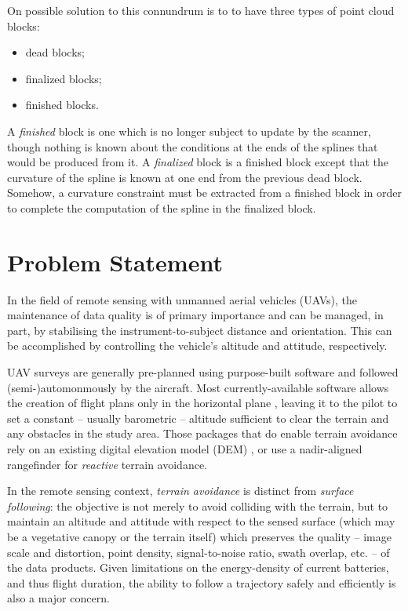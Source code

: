 \documentclass[doc]{apa6}
\begin{document}
On possible solution to this connundrum is to to have three types of point cloud blocks: 

\begin{itemize}
\item dead blocks;
\item finalized blocks;
\item finished blocks.
\end{itemize}

A \emph{finished} block is one which is no longer subject to update by the scanner, though nothing is known about the conditions at the ends of the splines that would be produced from it. A \emph{finalized} block is a finished block except that the curvature of the spline is known at one end from the previous dead block. Somehow, a curvature constraint must be extracted from a finished block in order to complete the computation of the spline in the finalized block.








\section{Problem Statement}

In the field of remote sensing with unmanned aerial vehicles (UAVs), the maintenance of data quality is of primary importance and can be managed, in part, by stabilising the instrument-to-subject distance and orientation. This can be accomplished by controlling the vehicle's altitude and attitude, respectively.

UAV surveys are generally pre-planned using purpose-built software and followed (semi-)automonmously by the aircraft. Most currently-available software allows the creation of flight plans only in the horizontal plane \parencite[e.g.,][]{ArduPilot2018,DJI2018a,Microdrones2018,Group2018,UAVToolbox2018}, leaving it to the pilot to set a constant -- usually barometric -- altitude sufficient to clear the terrain and any obstacles in the study area. Those packages that do enable terrain avoidance rely on an  existing digital elevation model (DEM) \parencite[e.g.,][]{PrecisionHawk2018,UgCS2018,MapsMadeEasy2018}, or use a nadir-aligned rangefinder for \emph{reactive} terrain avoidance.

In the remote sensing context, \emph{terrain avoidance} is distinct from \emph{surface following}: the objective is not merely to avoid colliding with the terrain, but to maintain an altitude and attitude with respect to the sensed surface (which may be a vegetative canopy or the terrain itself) which preserves the quality -- image scale and distortion, point density, signal-to-noise ratio, swath overlap, etc. -- of the data products. Given limitations on the energy-density of current batteries, and thus flight duration, the ability to follow a trajectory safely and efficiently is also a major concern.
\end{document}
